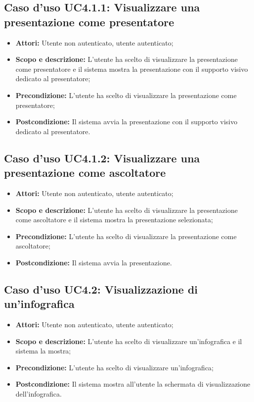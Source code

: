 \subsection{Caso d'uso UC4.1.1: Visualizzare una presentazione come presentatore}
\begin{itemize}
	\item \textbf{Attori:} Utente non autenticato, utente autenticato;
	\item \textbf{Scopo e descrizione:} L'utente ha scelto di visualizzare la presentazione come presentatore e il sistema mostra la presentazione con il supporto visivo dedicato al presentatore;
	\item \textbf{Precondizione:} L'utente ha scelto di visualizzare la presentazione come presentatore;
	\item \textbf{Postcondizione:} Il sistema avvia la presentazione con il supporto visivo dedicato al presentatore.
\end{itemize}

\subsection{Caso d'uso UC4.1.2: Visualizzare una presentazione come ascoltatore}
\begin{itemize}
	\item \textbf{Attori:} Utente non autenticato, utente autenticato;
	\item \textbf{Scopo e descrizione:} L'utente ha scelto di visualizzare la presentazione come ascoltatore e il sistema mostra la presentazione selezionata;
	\item \textbf{Precondizione:} L'utente ha scelto di visualizzare la presentazione come ascoltatore;
	\item \textbf{Postcondizione:} Il sistema avvia la presentazione.
\end{itemize}

\subsection{Caso d'uso UC4.2: Visualizzazione di un'infografica}
\begin{itemize}
	\item \textbf{Attori:} Utente non autenticato, utente autenticato;
	\item \textbf{Scopo e descrizione:} L'utente ha scelto di visualizzare un'\gls{infografica} e il sistema la mostra;
	\item \textbf{Precondizione:} L'utente ha scelto di visualizzare un'\gls{infografica};
	\item \textbf{Postcondizione:} Il sistema mostra all'utente la schermata di visualizzazione dell'\gls{infografica}.
\end{itemize}

